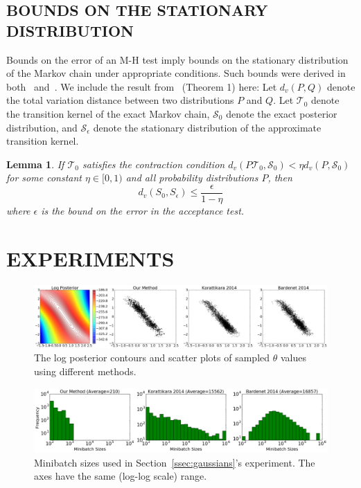 \documentclass[letterpaper]{article}
\newtheorem{lemma}{Lemma}
\begin{document}
\subsection{BOUNDS ON THE STATIONARY DISTRIBUTION}
Bounds on the error of an M-H test imply bounds on the stationary distribution
of the Markov chain under appropriate conditions. Such bounds were derived in
both~\citep{cutting_mh_2014} and~\citep{icml2014c1_bardenet14}. We include the
result from~\citep{cutting_mh_2014} (Theorem 1) here: Let $d_v(P,Q)$ denote the
total variation distance between two distributions $P$ and $Q$.  Let
$\mathcal{T}_0$ denote the transition kernel of the exact Markov chain,
$\mathcal{S}_0$ denote the exact posterior distribution, and
$\mathcal{S}_{\epsilon}$ denote the stationary distribution of the approximate
transition kernel. 
\begin{lemma}
If $\mathcal{T}_0$ satisfies the contraction condition
$d_v(P\mathcal{T}_0,\mathcal{S}_0) < \eta d_v(P,\mathcal{S}_0)$ for some
constant $\eta\in [0,1)$ and all probability distributions $P$, then
\begin{equation}
      d_v(S_0, S_{\epsilon}) \leq\frac{\epsilon}{1-\eta}
\end{equation}
where $\epsilon$ is the bound on the error in the acceptance test. 
\end{lemma}





\section{EXPERIMENTS}\label{sec:experiments}

\begin{figure}[t]
    \centering
    \includegraphics[width=0.9\linewidth]{posterior_of_gaussian.png}
    \caption{
    The log posterior contours and scatter plots of sampled $\theta$ values
    using different methods. 
    }
    \label{fig:gauss_mix_1}
\end{figure}
\begin{figure}[t]
    \centering
    \includegraphics[width=0.9\linewidth]{minibatch_size_gaussian.png}
    \caption{
    Minibatch sizes used in Section~\ref{ssec:gaussians}'s experiment. The axes
    have the same (log-log scale) range.
    }
    \label{fig:gauss_mix_2}
\end{figure}
\end{document}
